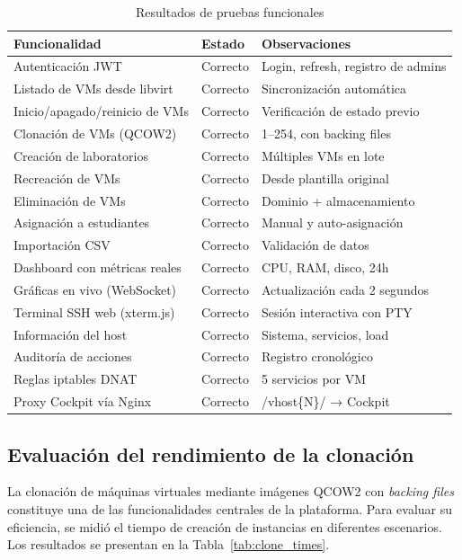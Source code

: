 \begin{table}[htbp]
\caption{Resultados de pruebas funcionales}
\label{tab:functional_tests}
\centering
\footnotesize
\begin{tabular}{p{3.5cm} p{2.5cm} p{3.5cm}}
\toprule
\textbf{Funcionalidad} & \textbf{Estado} & \textbf{Observaciones} \\
\midrule
Autenticación JWT & Correcto & Login, refresh, registro de admins \\
Listado de VMs desde libvirt & Correcto & Sincronización automática \\
Inicio/apagado/reinicio de VMs & Correcto & Verificación de estado previo \\
Clonación de VMs (QCOW2) & Correcto & 1--254, con backing files \\
Creación de laboratorios & Correcto & Múltiples VMs en lote \\
Recreación de VMs & Correcto & Desde plantilla original \\
Eliminación de VMs & Correcto & Dominio + almacenamiento \\
Asignación a estudiantes & Correcto & Manual y auto-asignación \\
Importación CSV & Correcto & Validación de datos \\
Dashboard con métricas reales & Correcto & CPU, RAM, disco, 24h \\
Gráficas en vivo (WebSocket) & Correcto & Actualización cada 2 segundos \\
Terminal SSH web (xterm.js) & Correcto & Sesión interactiva con PTY \\
Información del host & Correcto & Sistema, servicios, load \\
Auditoría de acciones & Correcto & Registro cronológico \\
Reglas iptables DNAT & Correcto & 5 servicios por VM \\
Proxy Cockpit vía Nginx & Correcto & /vhost\{N\}/ → Cockpit \\
\bottomrule
\end{tabular}
\end{table}

\subsection{Evaluación del rendimiento de la clonación}

La clonación de máquinas virtuales mediante imágenes QCOW2 con \textit{backing
files} constituye una de las funcionalidades centrales de la plataforma. Para
evaluar su eficiencia, se midió el tiempo de creación de instancias en diferentes
escenarios. Los resultados se presentan en la Tabla~\ref{tab:clone_times}.


